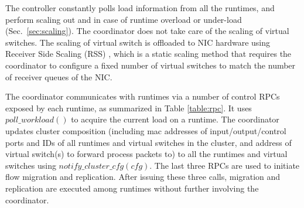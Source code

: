 The controller constantly polls load information from all the runtimes, and perform scaling out and in case of runtime overload or under-load %
(Sec.~\ref{sec:scaling}). The coordinator does not take care of the scaling of virtual switches. The scaling of virtual switch is offloaded to NIC hardware using Receiver Side Scaling (RSS) \cite{rss, jeong2014mtcp}, which is a static scaling method that requires the coordinator to configure a fixed number of virtual switches to match the number of receiver queues of the NIC.


The coordinator communicates with runtimes via a number of control RPCs exposed by each runtime, as summarized in Table \ref{table:rpc}. It uses $poll\_workload()$ to acquire the current load on a runtime. The coordinator updates cluster composition (including mac addresses of input/output/control ports and IDs of all runtimes and virtual switches in the cluster, and address of virtual switch(s) to forward process packets to) to all the runtimes and virtual switches using $notify\_cluster\_cfg(cfg)$.
The last three RPCs are used to initiate flow migration and replication. After issuing these three calls, migration and replication are executed among runtimes without further involving the coordinator. %





